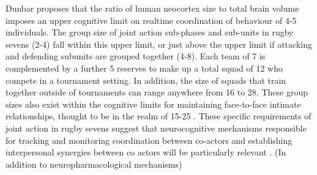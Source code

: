 Dunbar \textcite{Dunbar1992} proposes that the ratio of human neocortex size to total brain volume imposes an upper cognitive limit on realtime coordination of behaviour of  4-5 individuals.  The group size of joint action sub-phases and sub-units in rugby sevens (2-4) fall within this upper limit, or just above the upper limit if attacking and defending subunits are grouped together (4-8).  Each team of 7 is complemented by a further 5 reserves to make up a total squad of 12 who compete in a tournament setting.  In addition, the size of squads that train together outside of tournaments can range anywhere from 16 to 28.
These group sizes also exist within the cognitive limits for maintaining face-to-face intimate relationships, thought to be in the realm of 15-25 \citep{Dunbar1992,Dunbar2010}. These specific requirements of joint action in rugby sevens suggest that neurocognitive mechanisms responsible for tracking and monitoring coordination between co-actors and establishing interpersonal synergies between co actors will be particularly relevant \citep{Mogan2017}. (In addition to neuropharmacological mechanisms)

